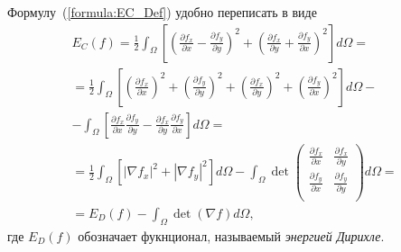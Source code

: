 Формулу~(\ref{formula:EC_Def}) удобно переписать в виде
\begin{multline}
\label{formula:EC}
  E_C(f) = \frac{1}{2} \int_{\Omega}\left[{
      \left(\frac{\partial f_x}{\partial x} - \frac{\partial f_y}{\partial y}\right)^2 + 
      \left(\frac{\partial f_x}{\partial y} + \frac{\partial f_y}{\partial x}\right)^2}\right] d\Omega = \\
  = \frac{1}{2} \int_{\Omega}\left[\left(\frac{\partial f_x}{\partial x}\right)^2 + \left(\frac{\partial f_y}{\partial y}\right)^2 + \left(\frac{\partial f_x}{\partial y}\right)^2 + 
  \left(\frac{\partial f_y}{\partial x}\right)^2 \right] d\Omega - \\
  - \int_{\Omega}\left[\frac{\partial f_x}{\partial x} \frac{\partial f_y}{\partial y} - \frac{\partial f_x}{\partial y} \frac{\partial f_y}{\partial x}\right] d\Omega = \\
  = \frac{1}{2} \int_{\Omega} \left[ \left| \nabla f_x \right| ^ 2 + \left| \nabla f_y \right| ^ 2 \right] d\Omega - \int_{\Omega} \det {\begin{pmatrix} 
    \frac{\partial f_x}{\partial x} & \frac{\partial f_x}{\partial y} \\
    \frac{\partial f_y}{\partial x} & \frac{\partial f_y}{\partial y} \\
  \end{pmatrix}} d\Omega = \\
  = E_D(f) - \int_{\Omega} \det (\nabla f) d\Omega,
\end{multline}
где $E_D(f)$ обозначает фукнционал, называемый \textit{энергией Дирихле}.
